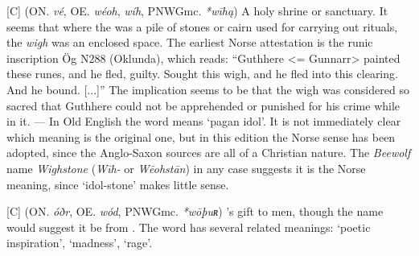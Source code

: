 \begin{itemize}
[C] (ON. \emph{vé}, OE. \emph{wéoh}, \emph{wíh}, PNWGmc. \emph{*wīhą})
  A holy shrine or sanctuary. It seems that where the  was a pile of stones or cairn used for carrying out rituals, the \emph{wigh} was an enclosed space. The earliest Norse attestation is the runic inscription Ög N288 (Oklunda), which reads: “Guthhere <= Gunnarr> painted these runes, and he fled, guilty. Sought this wigh, and he fled into this clearing. And he bound. [...]” The implication seems to be that the wigh was considered so sacred that Guthhere could not be apprehended or punished for his crime while in it. — In Old English the word means ‘pagan idol’. It is not immediately clear which meaning is the original one, but in this edition the Norse sense has been adopted, since the Anglo-Saxon sources are all of a Christian nature. The \emph{Beewolf} name \emph{Wighstone} (\emph{Wīh-} or \emph{Wēohstān}) in any case suggests it is the Norse meaning, since ‘idol-stone’ makes little sense.

[C] (ON. \emph{óðr}, OE. \emph{wód}, PNWGmc. \emph{*wōþuʀ})
  's gift to men, though the name would suggest it be from . The word has several related meanings: ‘poetic inspiration’, ‘madness’, ‘rage’.

\end{itemize}



